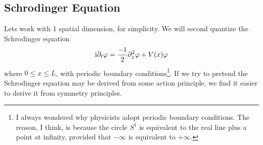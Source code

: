 \subsection{Schrodinger Equation}
Lets work with 1 spatial dimension, for simplicity. We will second
quantize the Schrodinger equation
\begin{equation}
\mathrm{i}\partial_{t}\varphi = \frac{-1}{2}\partial_{x}^{2}\varphi + V(x)\varphi
\end{equation}
where $0\leq x\leq L$, with periodic boundary conditions\footnote{I
  always wondered why physicists adopt periodic boundary conditions. The
  reason, I think, is because the circle $S^{1}$ is equivalent to the
  real line plus a point at infinity, provided that $-\infty$ is
  equivalent to $+\infty$.}. If we try to pretend the Schrodinger
equation may be derived from some action principle, we find it easier to
derive it from symmetry principles. 

